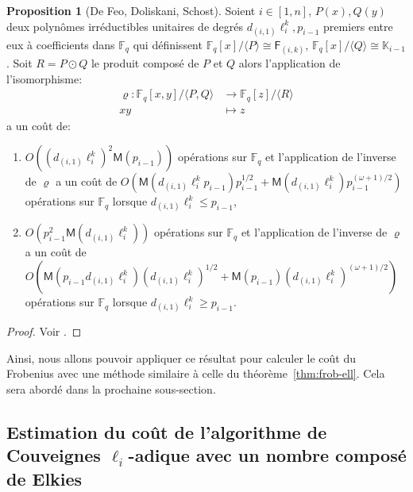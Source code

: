 \documentclass[10pt,a4paper]{book}
\theoremstyle{plain}
\theoremstyle{definition}
\theoremstyle{definition}
\theoremstyle{definition}
\theoremstyle{definition}
\newtheorem{prop}[thm]{Proposition}
\theoremstyle{definition}
\theoremstyle{remark}
\theoremstyle{remark}
\theoremstyle{definition}
\begin{document}
\begin{prop}[De Feo, Doliskani, Schost]
\label{pro:iso:fie}
Soient $i \in [1,n]$, $P(x),Q(y)$ deux polynômes irréductibles unitaires de degrés 
$d_{(i,1)}\ell_i^{k},p_{i-1}$ premiers entre eux à coefficients dans $\mathbb{F}_q$
qui définissent $\mathbb{F}_q[x]/\langle P \rangle \cong \mathsf{F}_{(i,k)}$,
$\mathbb{F}_q[x]/\langle Q \rangle \cong \mathbb{K}_{i-1}$. Soit $R=P \odot 
Q$ le produit composé de $P$ et $Q$ alors l'application de l'isomorphisme:
\begin{equation*}
\begin{alignedat}{1}
\varrho : \mathbb{F}_q[x,y]/\langle P, Q \rangle & \rightarrow \mathbb{F}_q[z]/\langle R \rangle \\
xy & \mapsto z
\end{alignedat}
\end{equation*}
a un coût de:
\begin{enumerate}
\item $O((d_{(i,1)}\ell_i^{k})^2\mathsf{M}(p_{i-1}))$ opérations sur $\mathbb{F}_q$
 et l'application de l'inverse de $\varrho$ a un coût de 
 $O(\mathsf{M}(d_{(i,1)}\ell_i^{k}p_{i-1})p_{i-1}^{1/2}+\mathsf{M}(d_{(i,1)}\ell_i^{k})p_{i-1}^{(\omega+1)/2})$ 
opérations sur $\mathbb{F}_q$ lorsque 
$d_{(i,1)}\ell_i^{k} \leqslant p_{i-1}$,
\item $O(p_{i-1}^2\mathsf{M}(d_{(i,1)}\ell_i^{k}))$ opérations sur $\mathbb{F}_q$ 
et l'application de l'inverse de $\varrho$ a un coût de 
$O(\mathsf{M}(p_{i-1}d_{(i,1)}\ell_i^{k})(d_{(i,1)}\ell_i^{k})^{1/2}+\mathsf{M}(p_{i-1})(d_{(i,1)}\ell_i^{k})^{(\omega+1)/2})$ 
opérations sur $\mathbb{F}_q$ lorsque $d_{(i,1)}\ell_i^{k} \geqslant p_{i-1}$.
\end{enumerate}
\end{prop}

\begin{proof}
Voir \cite{DeFeoDoliskaniSchost14}.
\end{proof}

Ainsi, nous allons pouvoir appliquer ce résultat pour calculer le coût du 
Frobenius avec une méthode similaire à celle du théorème~\ref{thm:frob-ell}. 
Cela sera abordé dans la prochaine sous-section.

\subsection{Estimation du coût de l'algorithme de Couveignes $\ell_i$-adique avec un nombre composé de Elkies}
\end{document}
